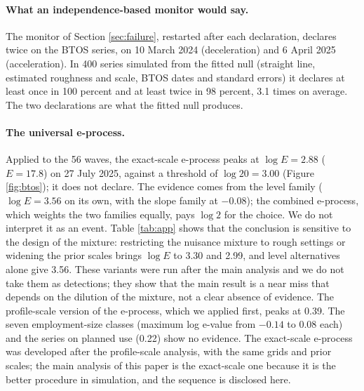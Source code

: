 \documentclass[11pt]{article}
\theoremstyle{plain}
\theoremstyle{definition}
\begin{document}
\begin{table}[t]
\centering\small
\caption{Maximum-likelihood AIC of competing models for the legacy-wording national series on current use and on planned use of artificial intelligence (lower is better; regime levels are in all models).}
\label{tab:models}

\end{table}

\paragraph{What an independence-based monitor would say.} The monitor of Section \ref{sec:failure}, restarted after each declaration, declares twice on the BTOS series, on 10 March 2024 (deceleration) and 6 April 2025 (acceleration). In 400 series simulated from the fitted null (straight line, estimated roughness and scale, BTOS dates and standard errors) it declares at least once in 100 percent and at least twice in 98 percent, 3.1 times on average. The two declarations are what the fitted null produces.

\paragraph{The universal e-process.} Applied to the 56 waves, the exact-scale e-process peaks at $\log E = 2.88$ ($E = 17.8$) on 27 July 2025, against a threshold of $\log 20 = 3.00$ (Figure \ref{fig:btos}); it does not declare. The evidence comes from the level family ($\log E = 3.56$ on its own, with the slope family at $-0.08$); the combined e-process, which weights the two families equally, pays $\log 2$ for the choice. We do not interpret it as an event. Table \ref{tab:app} shows that the conclusion is sensitive to the design of the mixture: restricting the nuisance mixture to rough settings or widening the prior scales brings $\log E$ to 3.30 and 2.99, and level alternatives alone give 3.56. These variants were run after the main analysis and we do not take them as detections; they show that the main result is a near miss that depends on the dilution of the mixture, not a clear absence of evidence. The profile-scale version of the e-process, which we applied first, peaks at 0.39. The seven employment-size classes (maximum log e-value from $-0.14$ to $0.08$ each) and the series on planned use (0.22) show no evidence. The exact-scale e-process was developed after the profile-scale analysis, with the same grids and prior scales; the main analysis of this paper is the exact-scale one because it is the better procedure in simulation, and the sequence is disclosed here.
\end{document}
